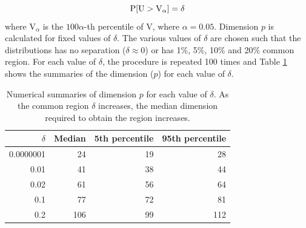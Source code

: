 $$\hbox{P}[\mbox{U} > \mbox{V}_{\alpha}] = \delta$$ where $\mbox{V}_{\alpha}$ is the $100\alpha$-th percentile of V, where $\alpha = 0.05$.  Dimension $p$ is calculated for fixed values of $\delta$. The various values of $\delta$ are chosen such that the distributions has no separation ($\delta \approx 0$) or has 1\%, 5\%, 10\% and 20\% common region. For each value of $\delta$, the procedure is repeated 100 times and Table \ref{tab:dimen} shows the summaries of the dimension ($p$) for each value of $\delta$.

\begin{table}[htbp]
\begin{center}
\caption{Numerical summaries of dimension $p$ for each value of $\delta$. As the common region $\delta$ increases, the median dimension required to obtain the region increases.}
\begin{tabular}{rrrr}
  \hline
  \hline
  $\delta$ & Median & 5th percentile & 95th percentile \\
  \hline
  0.0000001 & 24 & 19 & 28 \\
      0.01 & 41 & 38 & 44\\
   0.02 & 61 & 56 & 64 \\
     0.1 & 77 & 72 & 81\\   
     0.2 & 106 & 99 & 112\\ 
      \hline
\end{tabular}
\label{tab:dimen}
\end{center}
\end{table}



